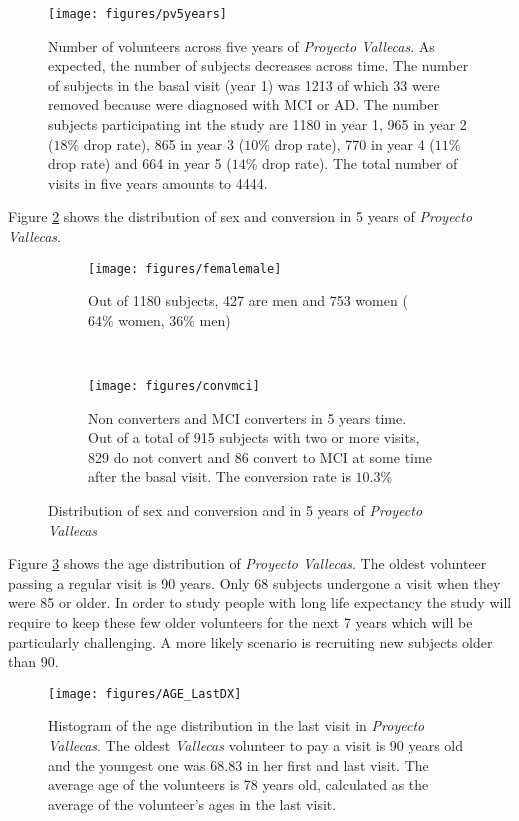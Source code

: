 \documentclass[11pt]{article}
\theoremstyle{definition}
\theoremstyle{remark}
\begin{document}
\begin{figure}[H]
        \centering
        \texttt{[image: figures/pv5years]}
        \caption{Number of volunteers across five years of \emph{Proyecto Vallecas}. As expected, the number of subjects decreases across time. The number of subjects in the basal visit (year 1) was 1213 of which 33 were removed because were diagnosed with MCI or AD. The number subjects participating int the study are 1180 in year 1, 965 in year 2 ($18\%$ drop rate), 865 in year 3 ($10\%$ drop rate), 770 in year 4 ($11\%$ drop rate) and 664 in year 5 ($14\%$ drop rate). The total number of visits in  five years amounts to 4444.} \label{fig:pv5years}
\end{figure}

Figure \ref{fig:sexmci} shows the distribution of sex and conversion in 5 years of \emph{Proyecto Vallecas}.
\begin{figure}[H] 
    \centering
    \begin{subfigure}[t]{0.49\textwidth}
        \centering
        \texttt{[image: figures/femalemale]}
        \caption{Out of 1180 subjects, 427 are men and 753 women ($64\%$ women, $36\%$ men)}
    \end{subfigure}
    ~ 
    \begin{subfigure}[t]{0.49\textwidth}
        \centering
        \texttt{[image: figures/convmci]}
        \caption{Non converters and MCI converters in 5 years time. Out of a total of 915 subjects with two or more visits, 829 do not convert and 86 convert to MCI at some time after the basal visit. The conversion rate is $10.3\%$}
    \end{subfigure}%
    \caption{Distribution of sex and conversion and in 5 years of \emph{Proyecto Vallecas}} \label{fig:sexmci}
\end{figure}

Figure \ref{fig:age_dx} shows the age distribution of \emph{Proyecto Vallecas}. The oldest volunteer passing a regular visit is 90 years. Only 68 subjects undergone a visit when they were 85 or older. 
In order to study people with long life expectancy the study will require to keep these few older volunteers for the next 7 years which will be particularly challenging. A more likely scenario is recruiting new subjects older than 90.

\begin{figure}[H] 
        \centering
        \texttt{[image: figures/AGE\_LastDX]}
        \caption{Histogram of the age distribution in the last visit in \emph{Proyecto Vallecas}. The oldest \emph{Vallecas} volunteer to pay  a visit is 90 years old and the youngest one was 68.83 in her first and last visit. The average age of the volunteers is 78 years old, calculated as the average of the volunteer's ages in the last visit.} \label{fig:age_dx}
\end{figure}
\end{document}

